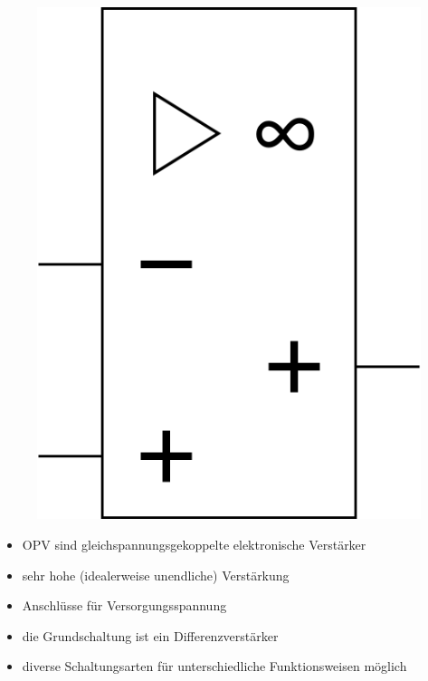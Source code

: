 \begin{frame}
\begin{minipage}{0.4\textwidth}
\begin{figure}
      \includegraphics[width=\textwidth,height=.4\textheight,keepaspectratio]{e13/OPV-ger.png}
    \end{figure}
  \end{minipage}
  \begin{center}
    \begin{itemize}
      \item OPV  sind gleichspannungsgekoppelte elektronische Verstärker
      \item sehr hohe (idealerweise unendliche) Verstärkung
      \item Anschlüsse für Versorgungsspannung
      \item die Grundschaltung ist ein Differenzverstärker
      \item diverse Schaltungsarten für unterschiedliche Funktionsweisen möglich
    \end{itemize}
  \end{center}
\end{frame}


